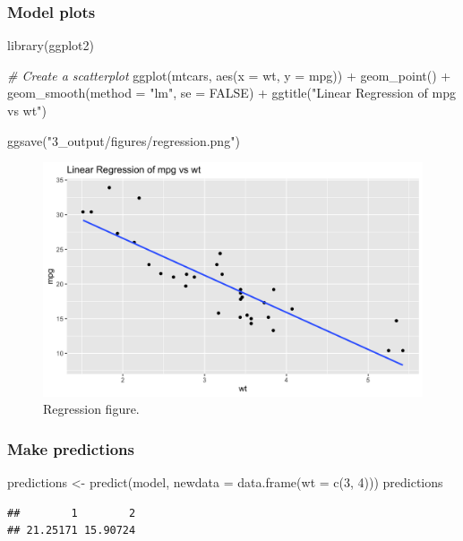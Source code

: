 \documentclass[
]{article}
\newenvironment{Shaded}{\begin{snugshade}}{\end{snugshade}}
\newcommand{\AttributeTok}[1]{\textcolor[rgb]{0.77,0.63,0.00}{#1}}
\newcommand{\CommentTok}[1]{\textcolor[rgb]{0.56,0.35,0.01}{\textit{#1}}}
\newcommand{\ConstantTok}[1]{\textcolor[rgb]{0.00,0.00,0.00}{#1}}
\newcommand{\DecValTok}[1]{\textcolor[rgb]{0.00,0.00,0.81}{#1}}
\newcommand{\FunctionTok}[1]{\textcolor[rgb]{0.00,0.00,0.00}{#1}}
\newcommand{\NormalTok}[1]{#1}
\newcommand{\OtherTok}[1]{\textcolor[rgb]{0.56,0.35,0.01}{#1}}
\newcommand{\SpecialCharTok}[1]{\textcolor[rgb]{0.00,0.00,0.00}{#1}}
\newcommand{\StringTok}[1]{\textcolor[rgb]{0.31,0.60,0.02}{#1}}
\begin{document}
\hypertarget{model-plots}{%
\subsubsection{Model plots}\label{model-plots}}

\begin{Shaded}
\begin{Highlighting}[]
\FunctionTok{library}\NormalTok{(ggplot2)}

\CommentTok{\# Create a scatterplot}
\FunctionTok{ggplot}\NormalTok{(mtcars, }\FunctionTok{aes}\NormalTok{(}\AttributeTok{x =}\NormalTok{ wt, }\AttributeTok{y =}\NormalTok{ mpg)) }\SpecialCharTok{+} \FunctionTok{geom\_point}\NormalTok{() }\SpecialCharTok{+} \FunctionTok{geom\_smooth}\NormalTok{(}\AttributeTok{method =} \StringTok{"lm"}\NormalTok{,}
    \AttributeTok{se =} \ConstantTok{FALSE}\NormalTok{) }\SpecialCharTok{+} \FunctionTok{ggtitle}\NormalTok{(}\StringTok{"Linear Regression of mpg vs wt"}\NormalTok{)}

\FunctionTok{ggsave}\NormalTok{(}\StringTok{"3\_output/figures/regression.png"}\NormalTok{)}
\end{Highlighting}
\end{Shaded}

\begin{figure}
\includegraphics[width=0.8\linewidth]{3_output/figures/regression} \caption{Regression figure.}\label{fig:regression}
\end{figure}

\hypertarget{make-predictions}{%
\subsubsection{Make predictions}\label{make-predictions}}

\begin{Shaded}
\begin{Highlighting}[]
\NormalTok{predictions }\OtherTok{\textless{}{-}} \FunctionTok{predict}\NormalTok{(model, }\AttributeTok{newdata =} \FunctionTok{data.frame}\NormalTok{(}\AttributeTok{wt =} \FunctionTok{c}\NormalTok{(}\DecValTok{3}\NormalTok{,}
    \DecValTok{4}\NormalTok{)))}
\NormalTok{predictions}
\end{Highlighting}
\end{Shaded}

\begin{verbatim}
##        1        2 
## 21.25171 15.90724
\end{verbatim}
\end{document}
